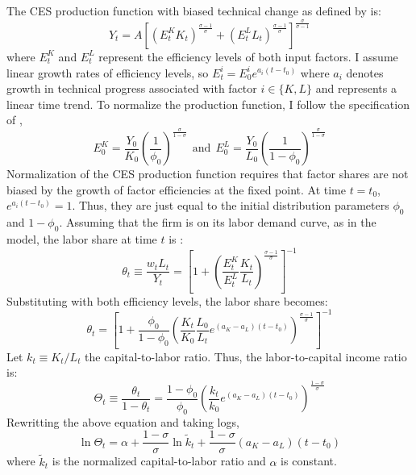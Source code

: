 The CES production function with biased technical change as defined by \cite{David1965} is:
\begin{equation*}
	Y_t = A\left[\left(E_t^K K_t\right)^\frac{\sigma-1}{\sigma} + \left(E_t^L L_t\right)^\frac{\sigma-1}{\sigma}\right]^\frac{\sigma}{\sigma-1}
\end{equation*}
where $E_t^K$ and $E^L_t$ represent the efficiency levels of both input factors. I assume linear growth rates of efficiency levels, so $E_t^i = E_0^i e^{a_i(t-t_0)}$ where $a_i$ denotes growth in technical progress associated with factor $i \in \lbrace K,L \rbrace$ and represents a linear time trend. To normalize the production function, I follow the specification of \cite{Klump2007},
\begin{equation*}
	E_0^K = \frac{Y_0}{K_0}\left(\frac{1}{\phi_0}\right)^\frac{\sigma}{1-\sigma} ~~\text{and}~~
	E_0^L = \frac{Y_0}{L_0}\left(\frac{1}{1-\phi_0}\right)^\frac{\sigma}{1-\sigma}
\end{equation*}
Normalization of the CES production function requires that factor shares are not biased by the growth of factor efficiencies at the fixed point. At time $t = t_0$, $e^{a_i(t-t_0)} = 1$.  Thus, they are just equal to the initial distribution parameters $\phi_0$ and $1-\phi_0$. Assuming that the firm is on its labor demand curve, as in the model, the labor share at time $t$ is :
\begin{equation*}
	\theta_t \equiv \frac{w_t L_t}{Y_t} = \left[1 + \left(\frac{E_t^K}{E_t^L}\frac{K_t}{L_t}\right)^\frac{\sigma-1}{\sigma}\right]^{-1}
\end{equation*}
Substituting with both efficiency levels, the labor share becomes:
\begin{equation*}
	\theta_t = \left[1 + \frac{\phi_0}{1-\phi_0}\left(\frac{K_t}{K_0}\frac{L_0}{L_t} e^{(a_K-a_L)(t-t_0)} \right)^\frac{\sigma-1}{\sigma}\right]^{-1}
\end{equation*}
Let $k_t \equiv K_t/L_t$ the capital-to-labor ratio. Thus, the labor-to-capital income ratio is:
\begin{equation*}
	\Theta_t \equiv \frac{\theta_t}{1-\theta_t} = \frac{1-\phi_0}{\phi_0}\left(\frac{k_t}{k_0} e^{(a_K - a_L)(t-t_0)}\right)^{\frac{1-\sigma}{\sigma}}
\end{equation*}
Rewritting the above equation and taking logs,
\begin{equation} \label{eq:est_sigma}
	\ln \Theta_t = \alpha + \frac{1-\sigma}{\sigma} \ln \tilde{k}_t + \frac{1-\sigma}{\sigma}(a_K-a_L)\left(t-t_0\right)
\end{equation}
where $\tilde{k}_t$ is the normalized capital-to-labor ratio and $\alpha$ is constant.

